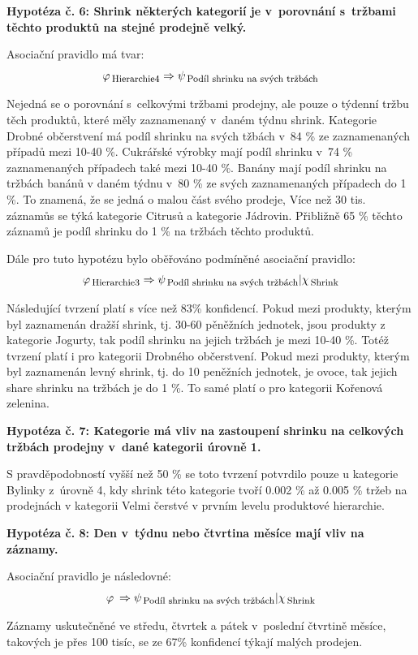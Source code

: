 \vspace*{1em}

\textbf{Hypotéza č. 6: Shrink některých kategorií je v~porovnání s~tržbami těchto produktů na stejné prodejně velký.}

Asociační pravidlo má tvar:
\begin{equation}
    \varphi_{\mbox{\,\footnotesize Hierarchie4}} \Rightarrow \psi_{\mbox{\,\footnotesize Podíl shrinku na svých tržbách}}
\end{equation}

Nejedná se o porovnání s~celkovými tržbami prodejny, ale pouze o týdenní tržbu těch produktů, které měly zaznamenaný v~daném týdnu shrink.
Kategorie Drobné občerstvení má podíl shrinku na svých tžbách v~84 \% ze zaznamenaných případů mezi 10-40 \%.
Cukrářské výrobky  mají podíl shrinku v~74 \% zaznamenaných případech také mezi 10-40 \%.
Banány mají podíl shrinku na tržbách banánů v daném týdnu v~80 \% ze svých zaznamenaných případech do 1 \%. To znamená, že se jedná o malou část svého prodeje,
Více než 30 tis. záznamůs se týká kategorie Citrusů a kategorie Jádrovin. Přibližně 65 \% těchto záznamů je podíl shrinku do 1 \% na tržbách těchto produktů.

Dále pro tuto hypotézu bylo oběřováno podmíněné asociační pravidlo:
\begin{equation}
    \varphi_{\mbox{\,\footnotesize Hierarchie3}} \Rightarrow \psi_{\mbox{\,\footnotesize Podíl shrinku na svých tržbách}} | \chi_{\mbox{\,\footnotesize Shrink}}
\end{equation} 

Následující tvrzení platí s více než 83\% konfidencí.
Pokud mezi produkty, kterým byl zaznamenán dražší shrink, tj. 30-60 pěněžních jednotek, jsou produkty z kategorie Jogurty, tak podíl shrinku na jejich tržbách je mezi 10-40 \%. Totéž tvrzení platí i pro kategorii Drobného občerstvení.
Pokud mezi produkty, kterým byl zaznamenán levný shrink, tj. do 10 peněžních jednotek, je ovoce, tak jejich share shrinku na tržbách je do 1 \%. To samé platí o pro kategorii Kořenová zelenina.

\vspace*{1em}

\textbf{Hypotéza č. 7: Kategorie má vliv na zastoupení shrinku na celkových tržbách prodejny v~dané kategorii úrovně 1.}

S pravděpodobností vyšší než 50 \% se toto tvrzení potvrdilo pouze u kategorie Bylinky z~úrovně 4, kdy shrink této kategorie tvoří 0.002 \% až 0.005 \% tržeb na prodejnách v kategorii Velmi čerstvé v prvním levelu produktové hierarchie.

\vspace*{1em}

\textbf{Hypotéza č. 8: Den v~týdnu nebo čtvrtina měsíce mají vliv na záznamy.}

Asociační pravidlo je následovné:
\begin{equation}
    \varphi_{\mbox{\,\footnotesize }} \Rightarrow \psi_{\mbox{\,\footnotesize Podíl shrinku na svých tržbách}} | \chi_{\mbox{\,\footnotesize Shrink}}
\end{equation} 

Záznamy uskutečněné ve středu, čtvrtek a pátek v~poslední čtvrtině měsíce, takových je přes 100 tisíc, se ze 67\% konfidencí týkají malých prodejen.